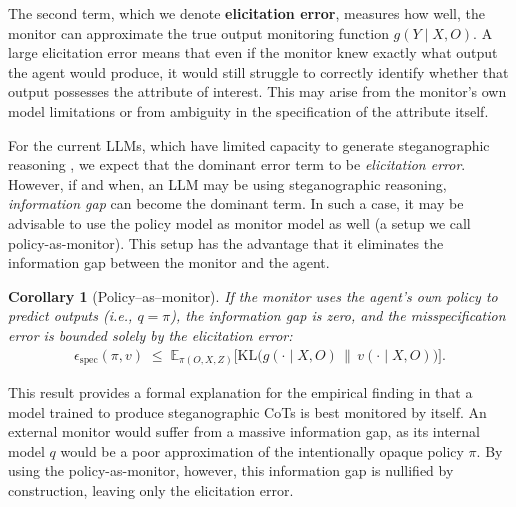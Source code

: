 \documentclass{article}
\theoremstyle{plain}
\newtheorem{corollary}[theorem]{Corollary}
\begin{document}
The second term, which we denote \textbf{elicitation error}, measures how well,  the monitor can approximate the true output monitoring function \(g(Y\mid X,O)\).
A large elicitation error means that even if the monitor knew exactly what output the agent would produce, it would still struggle to correctly identify whether that output possesses the attribute of interest.
This may arise from the monitor's own model limitations or from ambiguity in the specification of the attribute itself.

For the current LLMs, which have limited capacity to generate steganographic reasoning \citep{zolkowski2025early}, we expect that the dominant error term to be \textit{elicitation error}.
However, if and when, an LLM may be using steganographic reasoning, \textit{information gap} can become the dominant term.
In such a case, it may be advisable to use the policy model as monitor model as well (a setup we call policy-as-monitor).
This setup has the advantage that it eliminates the information gap between the monitor and the agent.

\begin{corollary}[Policy–as–monitor]
\label{cor:policy-as-monitor}
If the monitor uses the agent's own policy to predict outputs (i.e., \(q=\pi\)), the information gap is zero, and the misspecification error is bounded solely by the elicitation error:
\begin{align*}
\epsilon_{\mathrm{spec}}(\pi,v) \;\le\;
\mathbb{E}_{\pi(O,X,Z)} \big[
\mathrm{KL}\!\big(g(\cdot\mid X,O)\,\big\|\,v(\cdot\mid X,O)\big)\big].
\end{align*}
\end{corollary}

This result provides a formal explanation for the empirical finding in \citet{cooper2025gendistransfer} that a model trained to produce steganographic CoTs is best monitored by itself.
An external monitor would suffer from a massive information gap, as its internal model \(q\) would be a poor approximation of the intentionally opaque policy \(\pi\).
By using the policy-as-monitor, however, this information gap is nullified by construction, leaving only the elicitation error.
\end{document}
